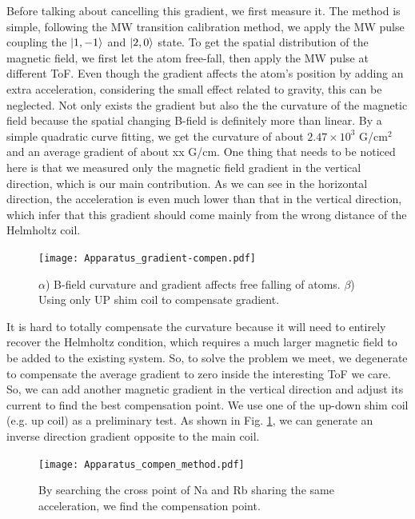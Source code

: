 Before talking about cancelling this gradient, we first measure it. The method is simple, following the MW transition calibration method, we apply the MW pulse coupling the $\ket{1,-1}$ and $\ket{2,0}$ state. To get the spatial distribution of the magnetic field, we first let the atom free-fall, then apply the MW pulse at different ToF. Even though the gradient affects the atom's position by adding an extra acceleration, considering the small effect related to gravity, this can be neglected. Not only exists the gradient but also the the curvature of the magnetic field because the spatial changing B-field is definitely more than linear. By a simple quadratic curve fitting, we get the curvature of about $2.47 \times 10^3$ G/cm$^2$ and an average gradient of about xx G/cm. One thing that needs to be noticed here is that we measured only the magnetic field gradient in the vertical direction, which is our main contribution. As we can see in the horizontal direction, the acceleration is even much lower than that in the vertical direction, which infer that this gradient should come mainly from the wrong distance of the Helmholtz coil.

\begin{figure}[htb]
\begin{center}
\texttt{[image: Apparatus\_gradient-compen.pdf]}
\end{center}
\caption[Method of compensating the magnetic field gradient]{$\alpha$) B-field curvature and gradient affects free falling of atoms. $\beta$) Using only UP shim coil to compensate gradient.}
\label{Apparatus_gradient-compen}
\end{figure}

It is hard to totally compensate the curvature because it will need to entirely recover the Helmholtz condition, which requires a much larger magnetic field to be added to the existing system. So, to solve the problem we meet, we degenerate to compensate the average gradient to zero inside the interesting ToF we care. So, we can add another magnetic gradient in the vertical direction and adjust its current to find the best compensation point. We use one of the up-down shim coil (e.g. up coil) as a preliminary test. As shown in Fig. \ref{Apparatus_gradient-compen}, we can generate an inverse direction gradient opposite to the main coil. 

\begin{figure}[htb]
\begin{center}
\texttt{[image: Apparatus\_compen\_method.pdf]}
\end{center}
\caption[Method of searching the compensation point]{By searching the cross point of Na and Rb sharing the same acceleration, we find the compensation point.}
\label{Apparatus_compen_method}
\end{figure}

